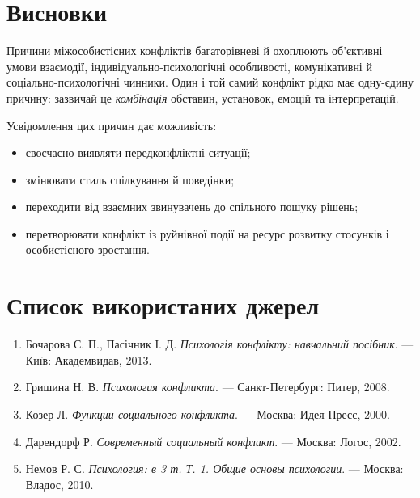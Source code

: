 \documentclass[12pt,a4paper]{article}
\begin{document}
    \section*{Висновки}
    Причини міжособистісних конфліктів багаторівневі й охоплюють об’єктивні умови взаємодії, індивідуально-психологічні особливості, 
    комунікативні й соціально-психологічні чинники. 
    Один і той самий конфлікт рідко має одну-єдину причину: зазвичай це \textit{комбінація} обставин, установок, емоцій та інтерпретацій.

    Усвідомлення цих причин дає можливість:
    \begin{itemize}
        \item своєчасно виявляти передконфліктні ситуації;
        \item змінювати стиль спілкування й поведінки;
        \item переходити від взаємних звинувачень до спільного пошуку рішень;
        \item перетворювати конфлікт із руйнівної події на ресурс розвитку стосунків і особистісного зростання.
    \end{itemize}

    \section*{Список використаних джерел}
    \begin{enumerate}
        \item Бочарова С. П., Пасічник І. Д. \textit{Психологія конфлікту: навчальний посібник}. --- Київ: Академвидав, 2013.
        \item Гришина Н. В. \textit{Психология конфликта}. --- Санкт-Петербург: Питер, 2008.
        \item Козер Л. \textit{Функции социального конфликта}. --- Москва: Идея-Пресс, 2000.
        \item Дарендорф Р. \textit{Современный социальный конфликт}. --- Москва: Логос, 2002.
        \item Немов Р. С. \textit{Психология: в 3 т. Т. 1. Общие основы психологии}. --- Москва: Владос, 2010.
    \end{enumerate}
\end{document}
